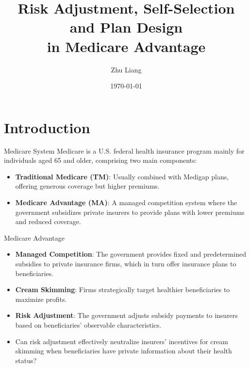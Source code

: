 \documentclass[professionalfonts, aspectratio=169]{beamer}
\title{Risk Adjustment, Self-Selection and Plan Design \\ in Medicare Advantage}
\institute{Stony Brook University}
\author{Zhu Liang}
\date{\today}
\begin{document}

\begin{frame} %
    \titlepage
\end{frame}

\section{Introduction}

\begin{frame}{Medicare System}
  Medicare is a U.S. federal health insurance program mainly for individuals aged 65 and older, comprising two main components:
  \begin{itemize}
    \item \textbf{Traditional Medicare (TM)}: Usually combined with Medigap plans, offering generous coverage but higher premiums.
    \item \textbf{Medicare Advantage (MA)}: A managed competition system where the government subsidizes private insurers to provide plans with lower premiums and reduced coverage.
  \end{itemize}
\end{frame}

\begin{frame}{Medicare Advantage}
  \begin{itemize}
    \item \textbf{Managed Competition}: The government provides fixed and predetermined subsidies to private insurance firms, which in turn offer insurance plans to beneficiaries.
    \item \textbf{Cream Skimming}: Firms strategically target healthier beneficiaries to maximize profits.
    \item \textbf{Risk Adjustment}: The government adjusts subsidy payments to insurers based on beneficiaries' observable characteristics.
    \item Can risk adjustment effectively neutralize insurers' incentives for cream skimming when beneficiaries have private information about their health status?
  \end{itemize}
\end{frame}
\end{document}
